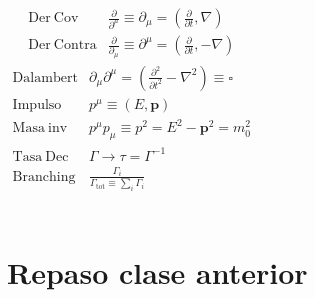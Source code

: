 \documentclass[xetex,mathserif,serif,10pt]{beamer}
\begin{document}
\begin{frame}
\begin{columns}
{\begin{eqnarray}
        \mathrm{Der\ Cov}        & \frac{\partial}{\partial^\mu} \equiv \partial_\mu = \left( \frac{\partial}{\partial t}, \nabla \right) \label{EQDerCov} \\
        \mathrm{Der\ Contra}     & \frac{\partial}{\partial_\mu} \equiv \partial^\mu = \left(\frac{\partial}{\partial t}, -\nabla \right) \label{EQDerContra}
      \end{eqnarray}
    }
    \small{
      \begin{eqnarray}
        \mathrm{Dalambert}   & \partial_\mu \partial^\mu = \left(\frac{\partial^2}{\partial t^2} - \nabla^2 \right) \equiv \square \label{EQDalambert} \\
        \mathrm{Impulso}     & p^\mu \equiv (E,\mathbf{p}) \label{EQEneMom} \\
        \mathrm{Masa\ inv}   & p^\mu p_\mu \equiv p^2 = E^2 -\mathbf{p}^2 = m_0^2 \label{EQMasaInvariante} \\
        \mathrm{Tasa\ Dec}   & \Gamma \to \tau = \Gamma^{-1}  \label{EQTasa} \\
        \mathrm{Branching}   & \frac{\Gamma_i}{\Gamma_{\mathrm{tot}} \equiv \sum_i \Gamma_i} \label{EQBranching}\\
      \end{eqnarray}
    }
  \end{columns}
\end{frame}

\section{Repaso clase anterior}
\end{document}
